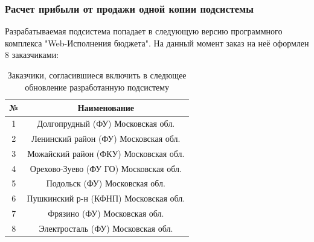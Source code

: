 \documentclass[a4paper]{extarticle}
\numberwithin{equation}{section}
\begin{document}
\subsubsection{Расчет прибыли от продажи одной копии подсистемы}
Разрабатываемая подсистема попадает в следующую версию программного комплекса "Web-Исполнения бюджета". На данный момент заказ на неё оформлен 8 заказчиками:\par
\begin{table}[H]
\caption{Заказчики, согласившиеся включить в следющее обновление разработанную подсистему}
  \begin{tabular}{|c|c|}
  \hline
  № & Наименование \\\hline
  1 & Долгопрудный (ФУ) Московская обл. \\\hline
  2 & Ленинский район (ФУ) Московская обл. \\\hline
  3 & Можайский район (ФКУ) Московская обл. \\\hline
  4 & Орехово-Зуево (ФУ ГО) Московская обл. \\\hline
  5 & Подольск (ФУ) Московская обл. \\\hline
  6 & Пушкинский р-н (КФНП) Московская обл. \\\hline
  7 & Фрязино (ФУ) Московская обл. \\\hline
  8 & Электросталь (ФУ) Московская обл. \\\hline
  \end{tabular}
\end{table}\par
\end{document}
